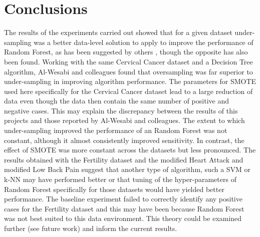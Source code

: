 \section{Conclusions}
The results of the experiments carried out showed that for a given dataset under-sampling was a better data-level solution to apply to improve the performance of Random Forest, as has been suggested by others \citep{Rekha:2019uu}, though the opposite has also been found. Working with the same Cervical Cancer dataset and a Decision Tree algorithm, Al-Wesabi and colleagues \citep{AlWesabi:hx} found that oversampling was far superior to under-sampling in improving algorithm performance. The parameters for SMOTE used here specifically for the Cervical Cancer dataset lead to a large reduction of data even though the data then contain the same number of positive and negative cases. This may explain the discrepancy between the results of this projects and those reported by Al-Wesabi and colleagues.\newline
The extent to which under-sampling improved the performance of an Random Forest was not constant, although it almost consistently improved sensitivity. In contrast, the effect of SMOTE was more constant across the datasets but less pronounced.\newline
The results obtained with the Fertility dataset and the modified Heart Attack and modified Low Back Pain suggest that another type of algorithm, such a SVM or k-NN may have performed better or that tuning of the hyper-parameters of Random Forest specifically for those datasets would have yielded better performance. The baseline experiment failed to correctly identify any positive cases for the Fertility dataset and this may have been because Random Forest was not best suited to this data environment. This theory could be examined further (see future work) and inform the current results.\newline


